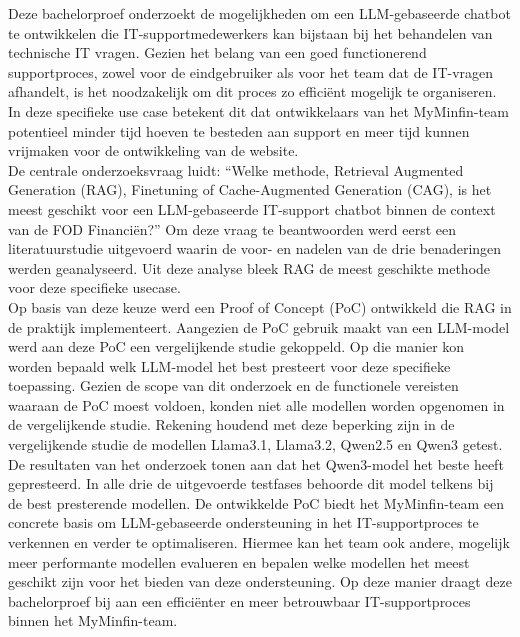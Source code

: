 Deze bachelorproef onderzoekt de mogelijkheden om een LLM-gebaseerde chatbot te ontwikkelen die IT-supportmedewerkers kan bijstaan bij het behandelen van technische IT vragen. Gezien het belang van een goed functionerend supportproces, zowel voor de eindgebruiker als voor het team dat de IT-vragen afhandelt, is het noodzakelijk om dit proces zo efficiënt mogelijk te organiseren. In deze specifieke use case betekent dit dat ontwikkelaars van het MyMinfin-team potentieel minder tijd hoeven te besteden aan support en meer tijd kunnen vrijmaken voor de ontwikkeling van de website.
\\[1em]
De centrale onderzoeksvraag luidt: “Welke methode, Retrieval Augmented Generation (RAG), Finetuning of Cache-Augmented Generation (CAG), is het meest geschikt voor een LLM-gebaseerde IT-support chatbot binnen de context van de FOD Financiën?” Om deze vraag te beantwoorden werd eerst een literatuurstudie uitgevoerd waarin de voor- en nadelen van de drie benaderingen werden geanalyseerd. Uit deze analyse bleek RAG de meest geschikte methode voor deze specifieke usecase.
\\[1em]
Op basis van deze keuze werd een Proof of Concept (PoC) ontwikkeld die RAG in de praktijk implementeert. Aangezien de PoC gebruik maakt van een LLM-model werd aan deze PoC een vergelijkende studie gekoppeld. Op die manier kon worden bepaald welk LLM-model het best presteert voor deze specifieke toepassing. Gezien de scope van dit onderzoek en de functionele vereisten waaraan de PoC moest voldoen, konden niet alle modellen worden opgenomen in de vergelijkende studie. Rekening houdend met deze beperking zijn in de vergelijkende studie de modellen Llama3.1, Llama3.2, Qwen2.5 en Qwen3 getest.
\\[1em]
De resultaten van het onderzoek tonen aan dat het Qwen3-model het beste heeft gepresteerd. In alle drie de uitgevoerde testfases behoorde dit model telkens bij de best presterende modellen. De ontwikkelde PoC biedt het MyMinfin-team een concrete basis om LLM-gebaseerde ondersteuning in het IT-supportproces te verkennen en verder te optimaliseren. Hiermee kan het team ook andere, mogelijk meer performante modellen evalueren en bepalen welke modellen het meest geschikt zijn voor het bieden van deze ondersteuning. Op deze manier draagt deze bachelorproef bij aan een efficiënter en meer betrouwbaar IT-supportproces binnen het MyMinfin-team.